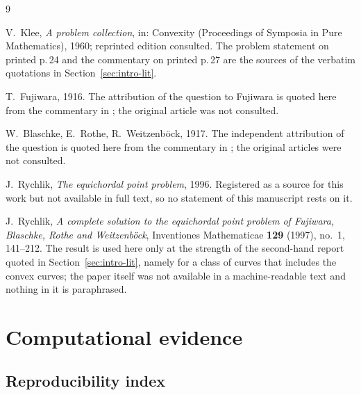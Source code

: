 \documentclass[11pt]{article}
\theoremstyle{definition}
\theoremstyle{remark}
\begin{document}
\begin{thebibliography}{9}

V.\ Klee,
\emph{A problem collection}, in: Convexity (Proceedings of Symposia in Pure Mathematics), 1960; reprinted
edition consulted. The problem statement on printed p.\,24 and the commentary on printed p.\,27 are the sources of
the verbatim quotations in Section~\ref{sec:intro-lit}.

T.\ Fujiwara, 1916. The attribution of the question to Fujiwara is quoted here from the commentary in
\cite{klee1960}; the original article was not consulted.

W.\ Blaschke, E.\ Rothe, R.\ Weitzenb\"ock, 1917. The independent attribution of the question is quoted here from
the commentary in \cite{klee1960}; the original articles were not consulted.

J.\ Rychlik, \emph{The equichordal point problem}, 1996. Registered as a source for this work but not available in
full text, so no statement of this manuscript rests on it.

J.\ Rychlik, \emph{A complete solution to the equichordal point problem of Fujiwara, Blaschke, Rothe and
Weitzenb\"ock}, Inventiones Mathematicae \textbf{129} (1997), no.\ 1, 141--212. The result is used here only at the
strength of the second-hand report quoted in Section~\ref{sec:intro-lit}, namely for a class of curves that
includes the convex curves; the paper itself was not available in a machine-readable text and nothing in it is
paraphrased.

\end{thebibliography}

\appendix

\section{Computational evidence}\label{app:comp}

\CompEvidenceBody

\subsection{Reproducibility index}\label{app:index}
\end{document}
